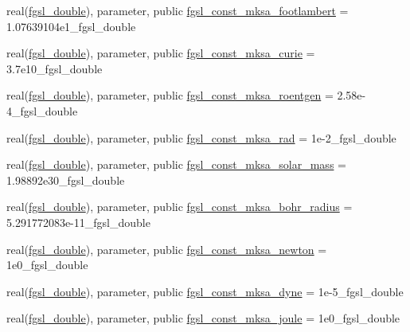 \begin{DoxyCompactItemize}
\item 
real(\hyperlink{namespacefgsl_a9af5113378e0f000eb479d3f90196ddf}{fgsl\+\_\+double}), parameter, public \hyperlink{namespacefgsl_a5362c5c67d790eba885afc839e76df4a}{fgsl\+\_\+const\+\_\+mksa\+\_\+footlambert} = 1.\+07639104e1\+\_\+fgsl\+\_\+double
\item 
real(\hyperlink{namespacefgsl_a9af5113378e0f000eb479d3f90196ddf}{fgsl\+\_\+double}), parameter, public \hyperlink{namespacefgsl_a96bbfcd3e0e6a9190e86a1a909b7407b}{fgsl\+\_\+const\+\_\+mksa\+\_\+curie} = 3.\+7e10\+\_\+fgsl\+\_\+double
\item 
real(\hyperlink{namespacefgsl_a9af5113378e0f000eb479d3f90196ddf}{fgsl\+\_\+double}), parameter, public \hyperlink{namespacefgsl_a0b3f21e2d3493c6d7662dbe77ab1fbe6}{fgsl\+\_\+const\+\_\+mksa\+\_\+roentgen} = 2.\+58e-\/4\+\_\+fgsl\+\_\+double
\item 
real(\hyperlink{namespacefgsl_a9af5113378e0f000eb479d3f90196ddf}{fgsl\+\_\+double}), parameter, public \hyperlink{namespacefgsl_a46fbda29caeb0f9c75253f461d340353}{fgsl\+\_\+const\+\_\+mksa\+\_\+rad} = 1e-\/2\+\_\+fgsl\+\_\+double
\item 
real(\hyperlink{namespacefgsl_a9af5113378e0f000eb479d3f90196ddf}{fgsl\+\_\+double}), parameter, public \hyperlink{namespacefgsl_accd84d0687faa8d8009cb69525c2c81d}{fgsl\+\_\+const\+\_\+mksa\+\_\+solar\+\_\+mass} = 1.\+98892e30\+\_\+fgsl\+\_\+double
\item 
real(\hyperlink{namespacefgsl_a9af5113378e0f000eb479d3f90196ddf}{fgsl\+\_\+double}), parameter, public \hyperlink{namespacefgsl_a52a0f9900118e47b537d0ee98ba88780}{fgsl\+\_\+const\+\_\+mksa\+\_\+bohr\+\_\+radius} = 5.\+291772083e-\/11\+\_\+fgsl\+\_\+double
\item 
real(\hyperlink{namespacefgsl_a9af5113378e0f000eb479d3f90196ddf}{fgsl\+\_\+double}), parameter, public \hyperlink{namespacefgsl_a502e10d884393483a5f705039802ef9f}{fgsl\+\_\+const\+\_\+mksa\+\_\+newton} = 1e0\+\_\+fgsl\+\_\+double
\item 
real(\hyperlink{namespacefgsl_a9af5113378e0f000eb479d3f90196ddf}{fgsl\+\_\+double}), parameter, public \hyperlink{namespacefgsl_a17365a3e64a2dd83aea9ebba6757fd7b}{fgsl\+\_\+const\+\_\+mksa\+\_\+dyne} = 1e-\/5\+\_\+fgsl\+\_\+double
\item 
real(\hyperlink{namespacefgsl_a9af5113378e0f000eb479d3f90196ddf}{fgsl\+\_\+double}), parameter, public \hyperlink{namespacefgsl_a2bb10acb778e8412e7c0bc7e7f95787b}{fgsl\+\_\+const\+\_\+mksa\+\_\+joule} = 1e0\+\_\+fgsl\+\_\+double
\item 

\end{DoxyCompactItemize}
